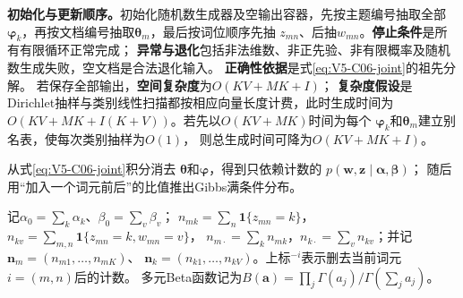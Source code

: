 \textbf{初始化与更新顺序。}初始化随机数生成器及空输出容器，先按主题编号抽取全部
$\boldsymbol\varphi_k$，再按文档编号抽取$\boldsymbol\theta_m$，最后按词位顺序先抽
$z_{mn}$、后抽$w_{mn}$。\textbf{停止条件}是所有有限循环正常完成；
\textbf{异常与退化}包括非法维数、非正先验、非有限概率及随机数生成失败，空文档是合法退化输入。
\textbf{正确性依据}是式\eqref{eq:V5-C06-joint}的祖先分解。
若保存全部输出，\textbf{空间复杂度}为$O(KV+MK+I)$；
\textbf{复杂度假设}是Dirichlet抽样与类别线性扫描都按相应向量长度计费，此时生成时间为
$O\!\left(KV+MK+I(K+V)\right)$。若先以$O(KV+MK)$时间为每个
$\boldsymbol\varphi_k$和$\boldsymbol\theta_m$建立别名表，使每次类别抽样为$O(1)$，
则总生成时间可降为$O(KV+MK+I)$。


\label{struct:V5-C06-CH11}

\begin{derivationgoalbox}
从式\eqref{eq:V5-C06-joint}积分消去
$\boldsymbol\theta$和$\boldsymbol\varphi$，得到只依赖计数的
$p(\boldsymbol w,\boldsymbol z\mid\boldsymbol\alpha,\boldsymbol\beta)$；
随后用“加入一个词元前后”的比值推出Gibbs满条件分布。
\end{derivationgoalbox}
\begin{derivationprepbox}
记$\alpha_0=\sum_k\alpha_k$、$\beta_0=\sum_v\beta_v$；
$n_{mk}=\sum_n\mathbf1\{z_{mn}=k\}$，
$n_{kv}=\sum_{m,n}\mathbf1\{z_{mn}=k,w_{mn}=v\}$，
$n_{m\cdot}=\sum_kn_{mk}$，$n_{k\cdot}=\sum_vn_{kv}$；并记
$\boldsymbol n_m=(n_{m1},\ldots,n_{mK})$、
$\boldsymbol n_k=(n_{k1},\ldots,n_{kV})$。上标$^{-i}$表示删去当前词元$i=(m,n)$后的计数。
多元Beta函数记为$B(\boldsymbol a)=\prod_j\Gamma(a_j)/\Gamma(\sum_ja_j)$。
\end{derivationprepbox}

